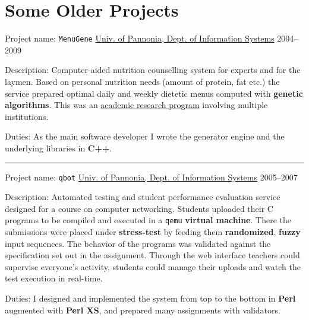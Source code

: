 \documentclass[a4paper,12pt]{article}
\newcommand\Yell{\textbf}
\newcommand\Label{\textsf}
\newcommand{\midline}{\rule[0.5ex]{\linewidth-\parindent}{.5pt}}
\begin{document}
\section{Some Older Projects}

\Label{Project name}: \texttt{MenuGene}\hfill
\href{http://virt.uni-pannon.hu/index.php/about-the-department}%
{Univ. of Pannonia, Dept. of Information Systems}
\Label{2004--2009}\par\medskip
\Label{Description}: Computer-aided nutrition counselling system for experts
and for the laymen.  Based on personal nutrition needs (amount of protein,
fat etc.) the service prepared optimal daily and weekly dietetic menus
computed with \Yell{genetic algorithms}.  This was an
\href{http://github.com/enadam/thesis/raw/master/thesis.pdf}%
{academic research program} involving multiple institutions.\par\medskip
\Label{Duties}: As the main software developer I wrote the generator engine
and the underlying libraries in \Yell{C++}.

\midline\par
\Label{Project name}: \texttt{qbot}\hfill
\href{http://virt.uni-pannon.hu/index.php/about-the-department}%
{Univ. of Pannonia, Dept. of Information Systems}
\Label{2005--2007}\par\medskip
\Label{Description}: Automated testing and student performance evaluation
service designed for a course on computer networking.  Students uploaded
their C programs to be compiled and executed in a \texttt{qemu} \Yell{virtual
machine}.  There the submissions were placed under \Yell{stress-test} by
feeding them \Yell{randomized}, \Yell{fuzzy} input sequences.  The behavior
of the programs was validated against the specification set out in the
assignment.  Through the web interface teachers could supervise everyone's
activity, students could manage their uploads and watch the test execution
in real-time.
\par\medskip
\Label{Duties}: I designed and implemented the system from top to the bottom
in \Yell{Perl} augmented with \Yell{Perl XS}, and prepared many assignments
with validators.
\end{document}
